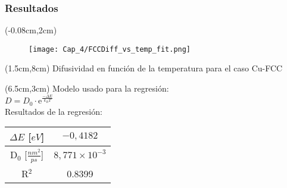 \begin{frame}
 \frametitle{Resultados}
 
  \begin{textblock*}{6.5cm}(-0.08cm,2cm) 
   \begin{figure}[htp]
    \centering
    \texttt{[image: Cap\_4/FCCDiff\_vs\_temp\_fit.png]}
   \end{figure}
  \end{textblock*}
  \begin{textblock*}{10cm}(1.5cm,8cm) 
    \centering
    Difusividad en funci\'on de la temperatura para el caso Cu-FCC
  \end{textblock*}
  
  \begin{textblock*}{6cm}(6.5cm,3cm)
    Modelo usado para la regresi\'on: \\
    $D = D_{0}\cdot \mathrm{e}^{\frac{-\Delta E}{k_{B} T}}$\\
    \vspace{0.5cm}
    Resultados de la regresi\'on:
    \begin{table}[htp]
      \begin{center}
      \begin{tabular}{*{2}{c}}
      \hline
      $\Delta E$ [$eV$]& $-0,4182$ \\
      \hline
      D$_{0}$ [$\frac{nm^{2}}{ps}$] & $8,771\times 10^{-3}$\\
      \hline
      R$^{2}$ & 0.8399 \\
      \hline
      \end{tabular}
      \end{center}
      \end{table}    
  \end{textblock*} 
\end{frame}

